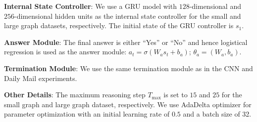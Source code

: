 \documentclass[sigconf]{acmart}
\begin{document}
\textbf{Internal State Controller}: We use a GRU model with $128$-dimensional and $256$-dimensional hidden units as the internal state controller for the small and large graph datasets, respectively. The initial state of the GRU controller is $s_1$.


\textbf{Answer Module}: The final answer is either ``Yes'' or ``No'' and hence logistical regression is used as the answer module:  $a_t = \sigma({W_a} s_t + {b_a})$; $\theta_{a} = ({W_{a}}, {b_{a}})$.

\textbf{Termination Module}: We use the same termination module as in the CNN and Daily Mail experiments.

\textbf{Other Details}: The maximum reasoning step $T_{\text{max}}$ is set to $15$ and $25$ for the small graph and large graph dataset, respectively. We use AdaDelta optimizer \citep{DBLP:journals/corr/abs-1212-5701} for parameter optimization with an initial learning rate of $0.5$ and a batch size of 32.
\end{document}
